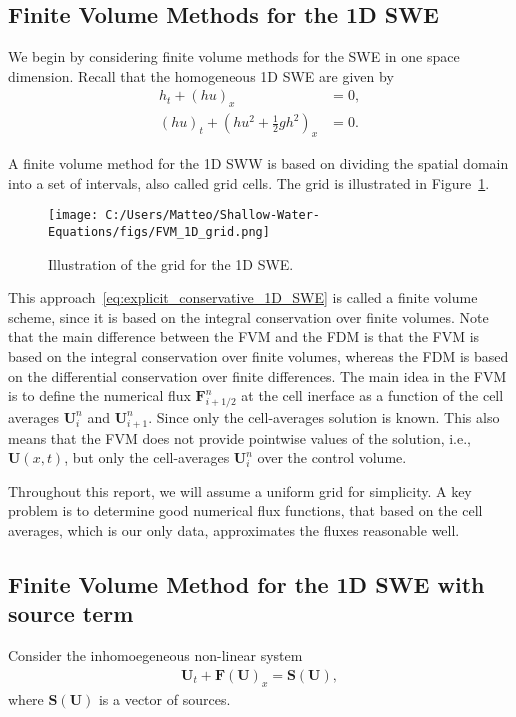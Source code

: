 \subsection{Finite Volume Methods for the 1D SWE}
We begin by considering finite volume methods for the SWE in one space dimension.
Recall that the homogeneous 1D SWE are given by
\begin{align*}
    h_t + {(hu)}_x &= 0, \\
    {(hu)}_t + {\left(hu^2 + \frac{1}{2}gh^2\right)}_x &= 0.
\end{align*}

A finite volume method for the 1D SWW is based on dividing the spatial domain into a set of intervals, also called grid cells.
The grid is illustrated in Figure~\ref{fig:FVM_1D_grid}.
\begin{figure}[H]
    \centering
    \texttt{[image: C:/Users/Matteo/Shallow-Water-Equations/figs/FVM\_1D\_grid.png]}
    \caption{Illustration of the grid for the 1D SWE.}\label{fig:FVM_1D_grid}
\end{figure}



This approach~\eqref{eq:explicit_conservative_1D_SWE} is called a finite volume scheme, since it is based on the integral conservation over finite volumes.
Note that the main difference between the FVM and the FDM is that the FVM is based on the integral conservation over finite volumes, whereas the FDM is based on the differential conservation over finite differences.
The main idea in the FVM is to define the numerical flux $\mathbf{F}_{i+1/2}^n$ at the cell inerface as a function of the cell averages $\mathbf{U}_i^n$ and $\mathbf{U}_{i+1}^n$.
Since only the cell-averages solution is known.
This also means that the FVM does not provide pointwise values of the solution, i.e., $\mathbf{U}(x,t)$, but only the cell-averages $\mathbf{U}_i^n$ over the control volume.

Throughout this report, we will assume a uniform grid for simplicity.
A key problem is to determine good numerical flux functions, that based on the cell averages, which is our only data, approximates the fluxes reasonable well. 



\subsection{Finite Volume Method for the 1D SWE with source term}
Consider the inhomoegeneous non-linear system
\begin{align*}
    \mathbf{U}_t + \mathbf{F(U)}_x = \mathbf{S(U)},
\end{align*} 
where $\mathbf{S(U)}$ is a vector of sources. 



